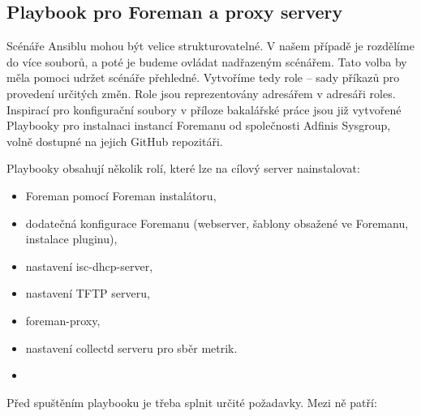 \documentclass[thesis=B,czech]{FITthesis}[2012/06/26]
\begin{document}
\subsection{Playbook pro Foreman a proxy servery}

Scénáře Ansiblu mohou být velice strukturovatelné. V našem případě je rozdělíme do více souborů, a poté je budeme ovládat nadřazeným scénářem. Tato volba by měla pomoci udržet scénáře přehledné. Vytvoříme tedy role -- sady příkazů pro provedení určitých změn. Role jsou reprezentovány adresářem v adresáři roles. Inspirací pro konfigurační soubory v příloze bakalářské práce jsou již vytvořené Playbooky pro instalnaci instancí Foremanu od společnosti Adfinis Sysgroup, volně dostupné na jejich GitHub repozitáři.

Playbooky obsahují několik rolí, které lze na cílový server nainstalovat:

\begin{itemize}
\item Foreman pomocí Foreman instalátoru,
\item dodatečná konfigurace Foremanu (webserver, šablony obsažené ve Foremanu, instalace pluginu),
\item nastavení isc-dhcp-server,
\item nastavení TFTP serveru,
\item foreman-proxy,
\item nastavení collectd serveru pro sběr metrik.
\item 
\end{itemize}

Před spuštěním playbooku je třeba splnit určité požadavky. Mezi ně patří:
\end{document}
